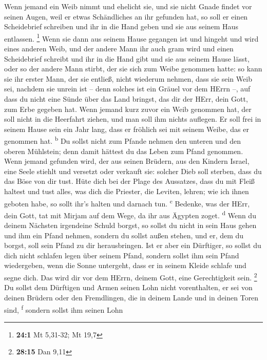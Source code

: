  Wenn jemand ein Weib nimmt und ehelicht sie, und sie
nicht Gnade findet vor seinen Augen, weil er etwas Schändliches an ihr
gefunden hat, so soll er einen Scheidebrief schreiben und ihr in die
Hand geben und sie aus seinem Haus entlassen. \footnote{\textbf{24:1} Mt
  5,31-32; Mt 19,7}  Wenn sie dann aus seinem Hause
gegangen ist und hingeht und wird eines anderen Weib,  und
der andere Mann ihr auch gram wird und einen Scheidebrief schreibt und
ihr in die Hand gibt und sie aus seinem Hause lässt, oder so der andere
Mann stirbt, der sie sich zum Weibe genommen hatte:  so
kann sie ihr erster Mann, der sie entließ, nicht wiederum nehmen, dass
sie sein Weib sei, nachdem sie unrein ist -- denn solches ist ein Gräuel
vor dem HErrn --, auf dass du nicht eine Sünde über das Land bringst,
das dir der HErr, dein Gott, zum Erbe gegeben hat.  Wenn
jemand kurz zuvor ein Weib genommen hat, der soll nicht in die Heerfahrt
ziehen, und man soll ihm nichts auflegen. Er soll frei in seinem Hause
sein ein Jahr lang, dass er fröhlich sei mit seinem Weibe, das er
genommen hat. \textsuperscript{b}  Du sollst nicht zum
Pfande nehmen den unteren und den oberen Mühlstein; denn damit hättest
du das Leben zum Pfand genommen.  Wenn jemand gefunden
wird, der aus seinen Brüdern, aus den Kindern Israel, eine Seele stiehlt
und versetzt oder verkauft sie: solcher Dieb soll sterben, dass du das
Böse von dir tust.  Hüte dich bei der Plage des Aussatzes,
dass du mit Fleiß haltest und tust alles, was dich die Priester, die
Leviten, lehren; wie ich ihnen geboten habe, so sollt ihr's halten und
darnach tun. \textsuperscript{c}  Bedenke, was der HErr,
dein Gott, tat mit Mirjam auf dem Wege, da ihr aus Ägypten zoget.
\textsuperscript{d}  Wenn du deinem Nächsten irgendeine
Schuld borgst, so sollst du nicht in sein Haus gehen und ihm ein Pfand
nehmen,  sondern du sollst außen stehen, und er, dem du
borgst, soll sein Pfand zu dir herausbringen.  Ist er
aber ein Dürftiger, so sollst du dich nicht schlafen legen über seinem
Pfand,  sondern sollst ihm sein Pfand wiedergeben, wenn
die Sonne untergeht, dass er in seinem Kleide schlafe und segne dich.
Das wird dir vor dem HErrn, deinem Gott, eine Gerechtigkeit sein.
\footnote{\textbf{28:15} Dan 9,11}  Du sollst dem
Dürftigen und Armen seinen Lohn nicht vorenthalten, er sei von deinen
Brüdern oder den Fremdlingen, die in deinem Lande und in deinen Toren
sind, \textsuperscript{f}  sondern sollst ihm seinen Lohn
